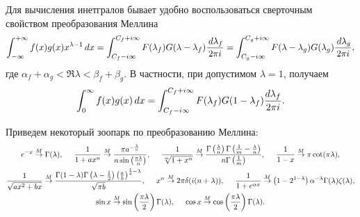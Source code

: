 Для вычисления инетгралов бывает удобно воспользоваться сверточным свойством преобразования Меллина
\begin{equation*}
	\int_{-\infty}^{+\infty} f(x) g(x) x^{\lambda-1} \, d x = 
	\int_{C_f - i \infty}^{C_f + i \infty} F(\lambda_f) G(\lambda-\lambda_f) \frac{\, d \lambda_f}{2\pi i}  = \int_{C_g - i \infty}^{C_g + i \infty}  F(\lambda-\lambda_g)  G(\lambda_g) \frac{\, d \lambda_g}{2\pi i},
\end{equation*}
где $\alpha_f + \alpha_g < \Re \lambda < \beta_f + \beta_g$. 
В частности, при допустимом $\lambda = 1$, получаем
\begin{equation*}
	\int_{0}^{\infty} f(x) g(x) \, d x = 
	\int_{C_f - i \infty}^{C_f + i \infty} F(\lambda_f) G(1-\lambda_f) \frac{d \lambda_f}{2 \pi i}.
\end{equation*}

Приведем некоторый зоопарк по преобразованию Меллина:
\begin{gather*}
	e^{-x} \overset{M}{\to}  \Gamma(\lambda),
	\hspace{5 mm} 
	\frac{1}{1 + a x^n} \overset{M}{\to} \frac{\pi  a^{-\frac{\lambda }{n}}}{n \sin \left(\frac{\pi  \lambda }{n}\right)},
	\hspace{5 mm} 
	\frac{1}{\sqrt[m]{1 + x^n}} \overset{M}{\to}
	\frac{\Gamma \left(\frac{\lambda }{n}\right) \Gamma \left(\frac{1}{m}-\frac{\lambda }{n}\right)}{n \Gamma \left(\frac{1}{m}\right)}, 
	\hspace{5 mm} 
	\frac{1}{1-x}\overset{M}{\to}  \pi  \cot (\pi  \lambda ),
	\\
	\frac{1}{\sqrt{a x^2+b x}}
	\overset{M}{\to}
	\frac{\Gamma (1-\lambda ) \Gamma \left(\lambda -\frac{1}{2}\right) \left(\frac{a}{b}\right)^{\frac{1}{2}-\lambda }}{\sqrt{\pi b}},
	\hspace{5 mm} 
	x^n \overset{M}{\to} 2 \pi  \delta (i (n+\lambda )), 
	\hspace{5 mm} 
	\frac{1}{1 + e^{\alpha x}} \overset{M}{\to}  \left(1-2^{1-\lambda }\right) \alpha ^{-\lambda } \Gamma (\lambda ) \zeta (\lambda ),
	\\ 
	\sin x \overset{M}{\to} \sin \left(\frac{\pi  \lambda }{2}\right) \Gamma (\lambda )
	, \hspace{5 mm}  
	\cos x \overset{M}{\to} \cos \left(\frac{\pi  \lambda }{2}\right) \Gamma (\lambda ).
\end{gather*}

